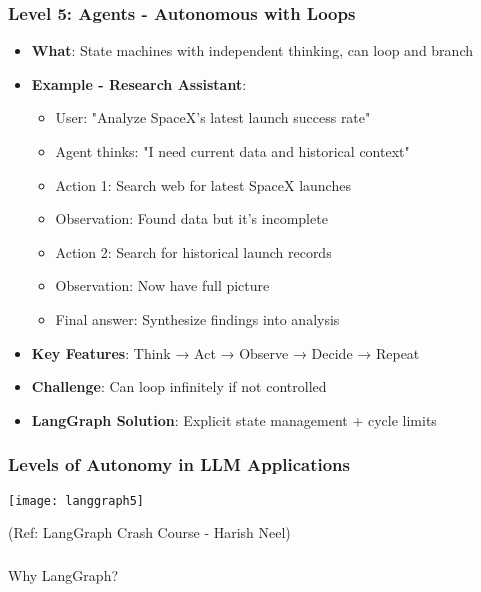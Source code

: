 \begin{frame}[fragile]\frametitle{Level 5: Agents - Autonomous with Loops}
      \begin{itemize}
        \item \textbf{What}: State machines with independent thinking, can loop and branch
        \item \textbf{Example - Research Assistant}:
        \begin{itemize}
            \item User: "Analyze SpaceX's latest launch success rate"
            \item Agent thinks: "I need current data and historical context"
            \item Action 1: Search web for latest SpaceX launches
            \item Observation: Found data but it's incomplete
            \item Action 2: Search for historical launch records
            \item Observation: Now have full picture
            \item Final answer: Synthesize findings into analysis
        \end{itemize}
        \item \textbf{Key Features}: Think → Act → Observe → Decide → Repeat
        \item \textbf{Challenge}: Can loop infinitely if not controlled
        \item \textbf{LangGraph Solution}: Explicit state management + cycle limits
      \end{itemize}
\end{frame}

\begin{frame}[fragile]\frametitle{Levels of Autonomy in LLM Applications}
\begin{center}
\texttt{[image: langgraph5]}

{\tiny (Ref: LangGraph Crash Course - Harish Neel)}
\end{center}	  
\end{frame}

\begin{frame}[fragile]\frametitle{}
\begin{center}
{\Large Why LangGraph?}
\end{center}
\end{frame}

